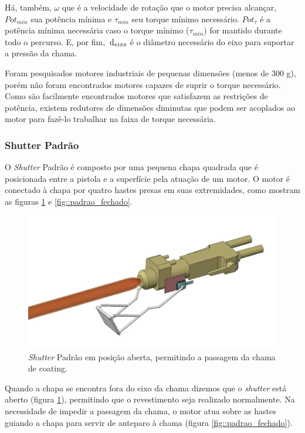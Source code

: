 Há, também, $\omega$ que é a velocidade de rotação que o motor precisa alcançar,
$Pot_{min}$ sua potência mínima e $\tau_{min}$ seu torque mínimo necessário.
$Pot_{\tau}$ é a potência mínima necessária caso o torque mínimo ($\tau_{min}$)
for mantido durante todo o percurso. E, por fim, $\,\mathrm{d}_{eixo}$ é o diâmetro necessário do eixo para suportar a
pressão da chama.

Foram pesquisados motores industriais de pequenas dimensões (menos de 300 g),
porém não foram encontrados motores capazes de suprir o torque necessário. Como
são facilmente encontrados motores que satisfazem as restrições de potência,
existem redutores de dimensões diminutas que podem ser acoplados ao motor para
fazê-lo trabalhar na faixa de torque necessária.


\subsubsection{Shutter Padrão}

O \textit{Shutter} Padrão é composto por uma pequena chapa quadrada que é
posicionada entre a pistola e a superfície pela atuação de um motor. O motor é
conectado à chapa por quatro hastes presas em suas extremidades, como mostram as
figuras \ref{fig::padrao_aberto} e \ref{fig::padrao_fechado}.

\begin{figure}[h!]
\centering
	\includegraphics[width=\columnwidth]{figs/estudo/shutter/Padrao_aberto}
	\caption{\textit{Shutter} Padrão em posição aberta, permitindo a passagem da chama
	de coating.}
	\label{fig::padrao_aberto}
\end{figure}

Quando a chapa se encontra fora do eixo da chama dizemos que
o \textit{shutter} está aberto (figura \ref{fig::padrao_aberto}), permitindo que
o revestimento seja realizado normalmente. Na necessidade de impedir a
passagem da chama, o motor atua sobre as hastes guiando a chapa para servir de
anteparo à chama (figura \ref{fig::padrao_fechado}).

